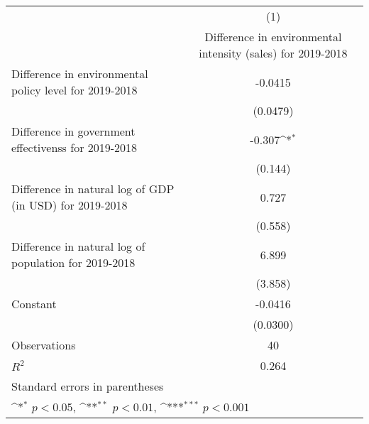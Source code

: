 {
\def\sym#1{\ifmmode^{#1}\else\(^{#1}\)\fi}
\begin{tabular}{l*{1}{c}}
\hline\hline
                    &\multicolumn{1}{c}{(1)}\\
                    &\multicolumn{1}{c}{Difference in environmental intensity (sales) for 2019-2018}\\
\hline
Difference in environmental policy level for 2019-2018&     -0.0415         \\
                    &    (0.0479)         \\
[1em]
Difference in government effectivenss for 2019-2018&      -0.307\sym{*}  \\
                    &     (0.144)         \\
[1em]
Difference in natural log of GDP (in USD) for 2019-2018&       0.727         \\
                    &     (0.558)         \\
[1em]
Difference in natural log of population for 2019-2018&       6.899         \\
                    &     (3.858)         \\
[1em]
Constant            &     -0.0416         \\
                    &    (0.0300)         \\
\hline
Observations        &          40         \\
\(R^{2}\)           &       0.264         \\
\hline\hline
\multicolumn{2}{l}{\footnotesize Standard errors in parentheses}\\
\multicolumn{2}{l}{\footnotesize \sym{*} \(p<0.05\), \sym{**} \(p<0.01\), \sym{***} \(p<0.001\)}\\
\end{tabular}
}

